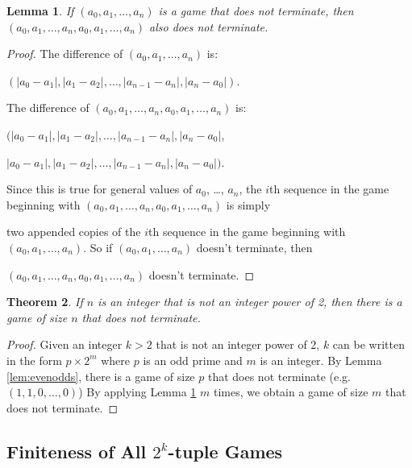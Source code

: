 \documentclass[12pt]{amsart}
\newtheorem{theorem}{Theorem}[section]
\newtheorem{lemma}[theorem]{Lemma}
\begin{document}
\begin{lemma}
\label{lem:doubles}
If $(a_0, a_1, \ldots, a_{n})$ is a game that does not terminate, then $(a_0, a_1, \ldots, a_n, a_0, a_1, \ldots, a_n)$ also does not terminate.
\end{lemma}

\begin{proof}

The difference of $(a_0, a_1, \ldots, a_{n})$ is:

\noindent
 $(|a_0 - a_1|, |a_1 - a_2|, \ldots, |a_{n-1} - a_n|, |a_n - a_0|)$.

\vspace{.2cm}

The difference of $(a_0, a_1, \ldots, a_{n}, a_0, a_1, \ldots, a_n)$ is:

\noindent
$(|a_0 - a_1|, |a_1 - a_2|, \ldots, |a_{n-1} - a_n|, |a_n - a_0|$,

\noindent
$|a_0 - a_1|, |a_1 - a_2|, \ldots, |a_{n-1} - a_n|, |a_n - a_0|)$.

Since this is true for general values of $a_0$, \ldots, $a_n$, the $i$th sequence in the game beginning with $(a_0, a_1, \ldots, a_{n}, a_0, a_1, \ldots, a_n)$ is simply

\noindent
two appended copies of the $i$th sequence in the game beginning with $(a_0, a_1, \ldots, a_{n})$. So if $(a_0, a_1, \ldots, a_{n})$ doesn't terminate, then 

\noindent
$(a_0, a_1, \ldots, a_{n}, a_0, a_1, \ldots, a_{n})$ doesn't terminate.

\end{proof}

\begin{theorem}
\label{theorem:notPowersOfTwo}
If $n$ is an integer that is not an integer power of 2, then there is a game of size $n$ that does not terminate.
\end{theorem}

\begin{proof}

Given an integer $k > 2$ that is not an integer power of 2, $k$ can be written in the form $p \times 2^{m}$ where $p$ is an odd prime and $m$ is an integer. By Lemma \ref{lem:evenodds}, there is a game of size $p$ that does not terminate (e.g. $(1,1,0, \ldots, 0)$) By applying Lemma \ref{lem:doubles} $m$ times, we obtain a game of size $m$ that does not terminate. 
\end{proof}

\subsection{Finiteness of All $2^k$-tuple Games}
\end{document}
